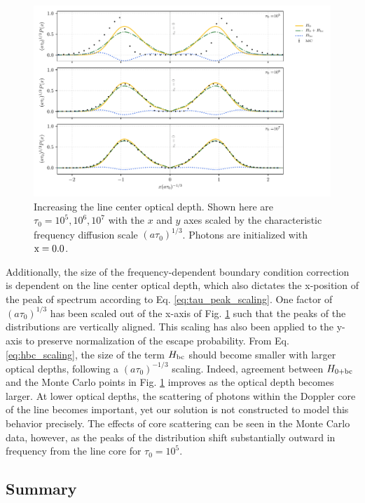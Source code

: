 \documentclass{aastex63}
\begin{document}
 \begin{figure}
    \centering
    \includegraphics{tau_threepanel.pdf}
    \caption{Increasing the line center optical depth. Shown here are $\tau_0 = 10^5, 10^6, 10^7$ with the $x$ and $y$ axes scaled by the characteristic frequency diffusion scale $(a\tau_0)^{1/3}$. Photons are initialized with $\rm x = 0.0$.} 
    \label{fig:sol_mc_tau}
\end{figure}

Additionally, the size of the frequency-dependent boundary condition correction is dependent on the line center optical depth, which also dictates the x-position of the peak of spectrum according to Eq. \ref{eq:tau_peak_scaling}. One factor of $(a\tau_0)^{1/3}$ has been scaled out of the x-axis of Fig. \ref{fig:sol_mc_tau} such that the peaks of the distributions are vertically aligned. This scaling has also been applied to the y-axis to preserve normalization of the escape probability. From Eq. \ref{eq:hbc_scaling}, the size of the term $H_{\rm bc}$ should become smaller with larger optical depths, following a $(a\tau_0)^{-1/3}$ scaling. Indeed, agreement between $H_{0 + \rm bc}$ and the Monte Carlo points in Fig. \ref{fig:sol_mc_tau} improves as the optical depth becomes larger. At lower optical depths, the scattering of photons within the Doppler core of the line becomes important, yet our solution is not constructed to model this behavior precisely. The effects of core scattering can be seen in the Monte Carlo data, however, as the peaks of the distribution shift substantially outward in frequency from the line core for $\tau_0 = 10^5$.

\subsection{Summary}
\end{document}
